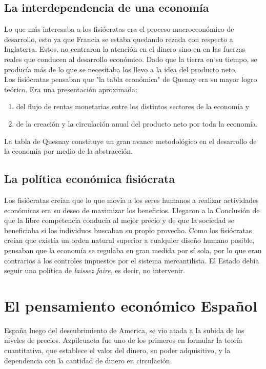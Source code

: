 \documentclass[10pt]{book}
\begin{document}
\subsection{La interdependencia de una economía}
Lo que más interesaba a los fisiócratas era el proceso macroeconómico de desarrollo, esto ya que Francia se estaba quedando rezada con respecto a Inglaterra. Estos, no centraron la atención en el dinero sino en en las fuerzas reales que conducen al desarrollo económico. Dado que la tierra en su tiempo, se producía más de lo que se necesitaba los llevo a la idea del producto neto.\\
Los fisiócratas pensaban que "la tabla económica" de Quenay era su mayor logro teórico. Era una presentación aproximada:

\begin{enumerate}[(1)]
    \item del flujo de rentas monetarias entre los distintos sectores de la economía y
    \item de la creación y la circulación anual del producto neto por toda la economía.
\end{enumerate}

La tabla  de Quesnay constituye un gran avance metodológico en el desarrollo de la economía por medio de la abstracción.

\subsection{La política económica fisiócrata}

Los fisiócratas creían que lo que movía a los seres humanos a realizar actividades económicas era su deseo de maximizar los beneficios. Llegaron a la Conclusión de que la libre competencia conducía al mejor precio y de que la sociedad se beneficiaba si los individuos buscaban su propio provecho. Como los fisiócratas creían que existía un orden natural superior a cualquier diseño humano posible, pensaban que la economía se regulaba en gran medida por sí sola, por lo que eran contrarios a los controles impuestos por el sistema mercantilista. El Estado debía seguir una política de \textit{laissez faire}, es decir, no intervenir.

\section{El pensamiento económico Español}
España luego del descubrimiento de America, se vio atada a la subida de los niveles de precios. Azpilcuaeta fue uno de los primeros en formular la teoría cuantitativa, que establece el valor del dinero, su poder adquisitivo, y la dependencia con la cantidad de dinero en circulación.
\end{document}

